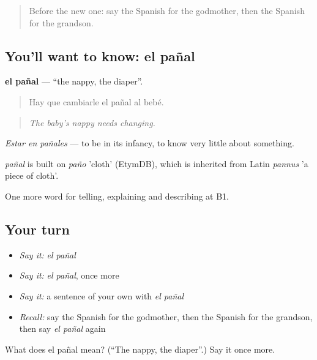 \label{lesson:ES-C546-panal}



\begin{quote}
Before the new one: say the Spanish for the godmother, then the Spanish for the grandson.
\end{quote}

\subsection*{You'll want to know: el pañal}
\textbf{el pañal} — \textquotedblleft{}the nappy, the diaper\textquotedblright{}.

\begin{quote}
Hay que cambiarle el pañal al bebé.
\end{quote}

\begin{quote}
\emph{The baby's nappy needs changing.}
\end{quote}

\emph{Estar en pañales} — to be in its infancy, to know very little about something.

\begin{cousinweb}
\emph{pañal} is built on \emph{paño} 'cloth' (EtymDB), which is inherited from Latin \emph{pannus} 'a piece of cloth'.
\end{cousinweb}

\begin{grammarlens}[title={What you've built}]
One more word for telling, explaining and describing at B1.
\end{grammarlens}

\subsection*{Your turn}
\begin{itemize}
\raggedright
  \item \emph{Say it:} \emph{el pañal}
  \item \emph{Say it:} \emph{el pañal}, once more
  \item \emph{Say it:} a sentence of your own with \emph{el pañal}
  \item \emph{Recall:} say the Spanish for the godmother, then the Spanish for the grandson, then say \emph{el pañal} again
\end{itemize}

\begin{tcolorbox}[breakable,colback=teal!4,colframe=teal!35!black,title={Before you move on}]
What does el pañal mean? (\textquotedblleft{}The nappy, the diaper\textquotedblright{}.) Say it once more.
\end{tcolorbox}

